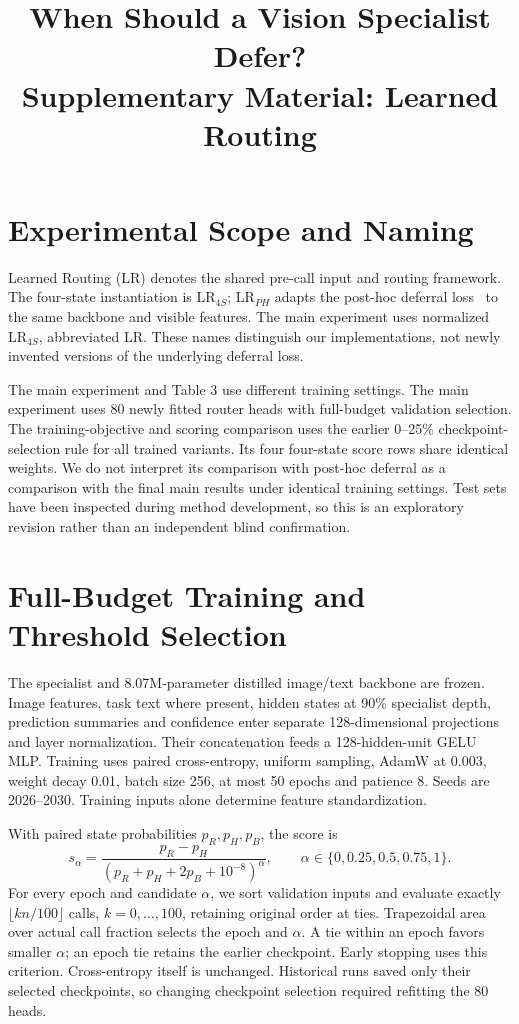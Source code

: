 \documentclass[10pt]{article}
\title{When Should a Vision Specialist Defer?\\\large Supplementary Material: Learned Routing}
\date{}
\begin{document}
\maketitle
\section{Experimental Scope and Naming}
Learned Routing (LR) denotes the shared pre-call input and routing framework. The four-state instantiation is $\mathrm{LR}_{4S}$; $\mathrm{LR}_{PH}$ adapts the post-hoc deferral loss~\cite{posthocdefer} to the same backbone and visible features. The main experiment uses normalized $\mathrm{LR}_{4S}$, abbreviated LR. These names distinguish our implementations, not newly invented versions of the underlying deferral loss.

The main experiment and Table 3 use different training settings. The main experiment uses 80 newly fitted router heads with full-budget validation selection. The training-objective and scoring comparison uses the earlier 0--25\% checkpoint-selection rule for all trained variants. Its four four-state score rows share identical weights. We do not interpret its comparison with post-hoc deferral as a comparison with the final main results under identical training settings. Test sets have been inspected during method development, so this is an exploratory revision rather than an independent blind confirmation.




\section{Full-Budget Training and Threshold Selection}
The specialist and 8.07M-parameter distilled image/text backbone are frozen. Image features, task text where present, hidden states at 90\% specialist depth, prediction summaries and confidence enter separate 128-dimensional projections and layer normalization. Their concatenation feeds a 128-hidden-unit GELU MLP. Training uses paired cross-entropy, uniform sampling, AdamW at 0.003, weight decay 0.01, batch size 256, at most 50 epochs and patience 8. Seeds are 2026--2030. Training inputs alone determine feature standardization.

With paired state probabilities $p_R,p_H,p_B$, the score is
\[
s_\alpha=\frac{p_R-p_H}{(p_R+p_H+2p_B+10^{-8})^\alpha},\qquad
\alpha\in\{0,0.25,0.5,0.75,1\}.
\]
For every epoch and candidate $\alpha$, we sort validation inputs and evaluate exactly $\lfloor kn/100\rfloor$ calls, $k=0,\ldots,100$, retaining original order at ties. Trapezoidal area over actual call fraction selects the epoch and $\alpha$. A tie within an epoch favors smaller $\alpha$; an epoch tie retains the earlier checkpoint. Early stopping uses this criterion. Cross-entropy itself is unchanged. Historical runs saved only their selected checkpoints, so changing checkpoint selection required refitting the 80 heads.
\end{document}
